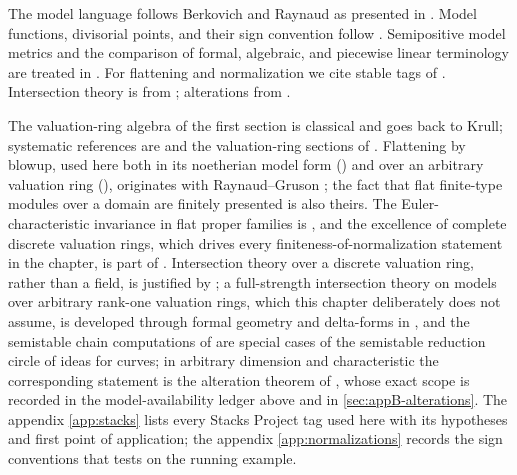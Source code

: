 The model language follows Berkovich and Raynaud as presented in
\cite{Berk12,BoschLutkebohmert1993}. Model functions, divisorial points, and
their sign convention follow \cite[\S2]{BFJ16}. Semipositive model metrics
and the comparison of formal, algebraic, and piecewise linear terminology are
treated in \cite{GM19}. For flattening and normalization we cite stable tags
of \cite{stacks-project}. Intersection theory is from \cite{Ful};
alterations from \cite{deJong1996}.

The valuation-ring algebra of the first section is classical and goes back
to Krull; systematic references are
\cite[Chapter~VI]{ZariskiSamuelII} and the valuation-ring sections of
\cite{stacks-project}.  Flattening by blowup, used here both in its
noetherian model form () and over an arbitrary
valuation ring (), originates
with Raynaud--Gruson \cite{RaynaudGruson1971}; the fact that flat
finite-type modules over a domain are finitely presented is also theirs.
The Euler-characteristic invariance in flat proper families is
\cite[7.9.4]{EGAIII2}, and the excellence of complete discrete valuation
rings, which drives every finiteness-of-normalization statement in the
chapter, is part of \cite[Scholie~7.8.3]{EGAIV2}.  Intersection theory
over a discrete valuation ring, rather than a field, is justified by
\cite[\S20.1]{Ful}; a full-strength intersection theory on models over
arbitrary rank-one valuation rings, which this chapter deliberately does
not assume, is developed through formal geometry and delta-forms in
\cite{GK17,GK19}, and the semistable chain computations of
 are special cases of the semistable reduction
circle of ideas for curves; in arbitrary dimension and characteristic the
corresponding statement is the alteration theorem of \cite{deJong1996},
whose exact scope is recorded in the model-availability ledger above and
in \cref{sec:appB-alterations}.  The appendix
\cref{app:stacks} lists every Stacks Project tag used here with its
hypotheses and first point of application; the appendix
\cref{app:normalizations} records the sign conventions that
 tests on the running example.
